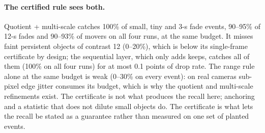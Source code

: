 \paragraph{The certified rule sees both.} Quotient + multi-scale catches 100\% of small, tiny and 3-s fade events, 90--95\% of 12-s fades and 90--93\% of movers on all four runs, at the same budget. It misses faint persistent objects of contrast 12 (0--20\%), which is below its single-frame certificate by design; the sequential layer, which only adds keeps, catches all of them (100\% on all four runs) for at most 0.1 points of drop rate. The range rule alone at the same budget is weak (0--30\% on every event): on real cameras sub-pixel edge jitter consumes its budget, which is why the quotient and multi-scale refinements exist. The certificate is not what produces the recall here; anchoring and a statistic that does not dilute small objects do. The certificate is what lets the recall be stated as a guarantee rather than measured on one set of planted events.
